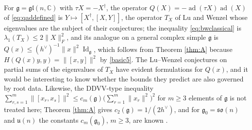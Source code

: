 \documentclass[leqno,10pt]{amsart}
\theoremstyle{definition}
\numberwithin{equation}{section}
\newcommand{\so}{\mathfrak{so}}
\newcommand{\id}{\operatorname{Id}}
\newcommand{\gl}{\mathfrak{gl}}
\newcommand{\g}{\mathfrak{g}}
\newcommand{\ad}{\operatorname{ad}}
\newcommand{\com}{\mathbb C}
\newcommand{\gz}{\g_{0}}
\newcommand{\hv}{h^\vee}
\newcommand{\norm}[1]{\lVert #1\rVert}
\newcommand{\fnorm}[1]{\lVert #1\rVert_{F}}
\newcommand{\qad}{Q}
\begin{document}
\begin{remark}
For $\g = \gl(n, \com)$ with $\tau X = -X^{\dagger}$, the operator $\qad(X) = -\ad(\tau X)\ad(X)$ of \eqref{eq:qaddefined} is $Y \mapsto [X^{\dagger}, [X, Y]]$, the operator $T_{X}$ of Lu and Wenzel \cite{Ge-Li-Lu-Zhou, Lu-Wenzel} whose eigenvalues are the subject of their conjectures; the inequality \eqref{eq:bwclassical} is $\lambda_{1}(T_{X}) \leq 2\fnorm{X}^{2}$, and its analogue on a general complex simple $\g$ is $\qad(x) \leq (\hv)^{-1}\norm{x}^{2}\id_{\g}$, which follows from Theorem \ref{thm:A} because $H(\qad(x)y, y) = \norm{[x, y]}^{2}$ by \eqref{basic5}. The Lu--Wenzel conjectures on partial sums of the eigenvalues of $T_{X}$ have evident formulations for $\qad(x)$, and it would be interesting to know whether the bounds they predict are also governed by root data. Likewise, the DDVV-type inequality $\sum_{r, s = 1}^{m}\norm{[x_{r}, x_{s}]}^{2} \leq c_{m}(\g)\big(\sum_{r = 1}^{m}\norm{x_{r}}^{2}\big)^{2}$ for $m \geq 3$ elements of $\g$ is not treated here; Theorem \ref{thm:A} gives $c_{2}(\g) = 1/(2\hv)$, and for $\gz = \so(n)$ and $\mathfrak{u}(n)$ the constants $c_{m}(\gz)$, $m \geq 3$, are known \cite{Ge, Ge-Xu-You-Zhou}.
\end{remark}
\end{document}
